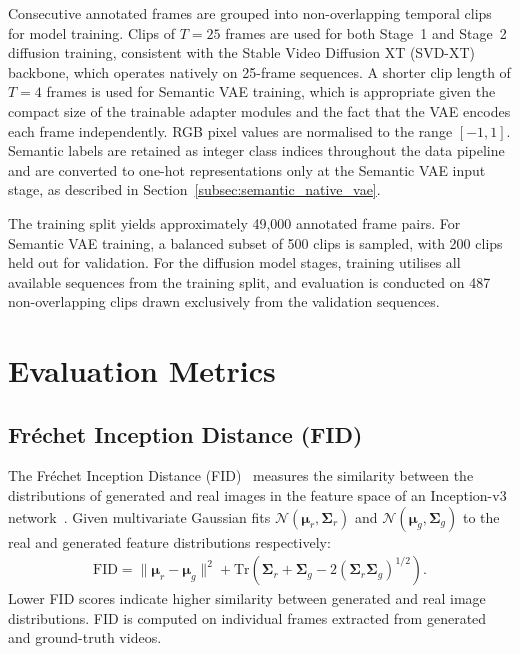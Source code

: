 Consecutive annotated frames are grouped into non-overlapping temporal clips for model training. Clips of $T = 25$ frames are used for both Stage~1 and Stage~2 diffusion training, consistent with the Stable Video Diffusion XT (SVD-XT)~\cite{blattmann2023stable} backbone, which operates natively on 25-frame sequences. A shorter clip length of $T = 4$ frames is used for Semantic VAE training, which is appropriate given the compact size of the trainable adapter modules and the fact that the VAE encodes each frame independently. RGB pixel values are normalised to the range $[-1, 1]$. Semantic labels are retained as integer class indices throughout the data pipeline and are converted to one-hot representations only at the Semantic VAE input stage, as described in Section~\ref{subsec:semantic_native_vae}.

The training split yields approximately 49,000 annotated frame pairs. For Semantic VAE training, a balanced subset of 500 clips is sampled, with 200 clips held out for validation. For the diffusion model stages, training utilises all available sequences from the training split, and evaluation is conducted on 487 non-overlapping clips drawn exclusively from the validation sequences.

\FloatBarrier
\section{Evaluation Metrics}
\label{sec:metrics}

\subsection{Fr\'echet Inception Distance (FID)}
\label{subsec:fid}

The Fr\'echet Inception Distance (FID)~\cite{heusel2017gans} measures the similarity between the distributions of generated and real images in the feature space of an Inception-v3 network~\cite{szegedy2016rethinking}. Given multivariate Gaussian fits $\mathcal{N}(\boldsymbol{\mu}_r, \boldsymbol{\Sigma}_r)$ and $\mathcal{N}(\boldsymbol{\mu}_g, \boldsymbol{\Sigma}_g)$ to the real and generated feature distributions respectively:
\begin{align}
    \text{FID} = \|\boldsymbol{\mu}_r - \boldsymbol{\mu}_g\|^2 + \text{Tr}\!\left(\boldsymbol{\Sigma}_r + \boldsymbol{\Sigma}_g - 2\left(\boldsymbol{\Sigma}_r \boldsymbol{\Sigma}_g\right)^{1/2}\right).
    \label{eq:fid}
\end{align}
Lower FID scores indicate higher similarity between generated and real image distributions. FID is computed on individual frames extracted from generated and ground-truth videos.

